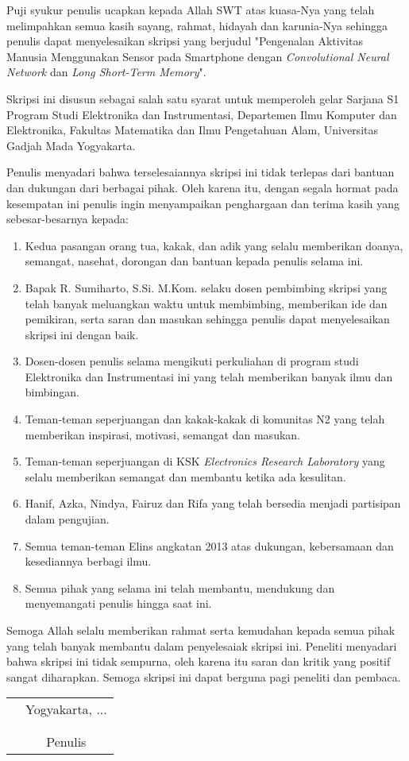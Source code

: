 \preface
Puji syukur penulis ucapkan kepada Allah SWT atas kuasa-Nya yang telah melimpahkan semua kasih sayang, rahmat, hidayah dan karunia-Nya sehingga penulis dapat menyelesaikan skripsi yang berjudul "Pengenalan Aktivitas Manusia Menggunakan Sensor pada Smartphone dengan \textit{Convolutional Neural Network} dan \textit{Long Short-Term Memory}".

Skripsi ini disusun sebagai salah satu syarat untuk memperoleh gelar Sarjana S1 Program Studi Elektronika dan Instrumentasi, Departemen Ilmu Komputer dan Elektronika, Fakultas Matematika dan Ilmu Pengetahuan Alam, Universitas Gadjah Mada Yogyakarta.

Penulis menyadari bahwa terselesaiannya skripsi ini tidak terlepas dari bantuan dan dukungan dari berbagai pihak. Oleh karena itu, dengan segala hormat pada kesempatan ini penulis ingin menyampaikan penghargaan dan terima kasih yang sebesar-besarnya kepada:

\begin{enumerate}
    \item Kedua pasangan orang tua, kakak, dan adik yang selalu memberikan doanya, semangat, nasehat, dorongan dan bantuan kepada penulis selama ini.
    \item Bapak R. Sumiharto, S.Si. M.Kom. selaku dosen pembimbing skripsi yang telah banyak meluangkan waktu untuk membimbing, memberikan ide dan pemikiran, serta saran dan masukan sehingga penulis dapat menyelesaikan skripsi ini dengan baik.
    \item Dosen-dosen penulis selama mengikuti perkuliahan di program studi Elektronika dan Instrumentasi ini yang telah memberikan banyak ilmu dan bimbingan.
    \item Teman-teman seperjuangan dan kakak-kakak di komunitas N2 yang telah memberikan inspirasi, motivasi, semangat 
    dan masukan.
    \item Teman-teman seperjuangan di KSK \textit{Electronics Research Laboratory} yang selalu memberikan semangat dan membantu ketika ada kesulitan.
    \item Hanif, Azka, Nindya, Fairuz dan Rifa yang telah bersedia menjadi partisipan dalam pengujian.
    \item Semua teman-teman Elins angkatan 2013 atas dukungan, kebersamaan dan kesediannya berbagi ilmu.
    \item Semua pihak yang selama ini telah membantu, mendukung dan menyemangati penulis hingga saat ini.
\end{enumerate}

Semoga Allah selalu memberikan rahmat serta kemudahan kepada semua pihak yang telah banyak membantu dalam penyelesaiak skripsi ini. Peneliti menyadari bahwa skripsi ini tidak sempurna, oleh karena itu saran dan kritik yang positif sangat diharapkan. Semoga skripsi ini dapat berguna pagi peneliti dan pembaca.

\vspace{1.5cm}
\begin{tabular}{p{7.5cm}c}
&Yogyakarta, ...\\
&\\
&\\
&Penulis
\end{tabular}
\vfill